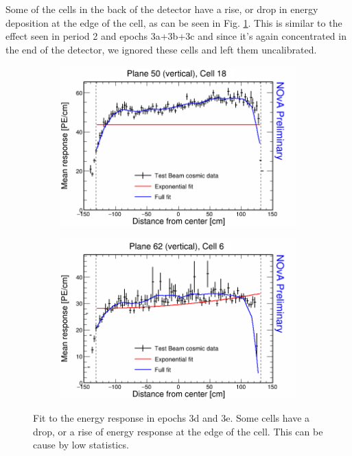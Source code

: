 Some of the cells in the back of the detector have a rise, or drop in energy deposition at the edge of the cell, as can be seen in Fig. \ref{fig:AttenfitResultsEpoch3de_CellEdges}. This is similar to the effect seen in period 2 and epochs 3a+3b+3c and since it's again concentrated in the end of the detector, we ignored these cells and left them uncalibrated.

\begin{figure}[h]
  \begin{subfigure}{0.495\textwidth}
    \includegraphics[width=\linewidth]{Plots/RelativeCalibrationResults/ep3de_050_018.png}
  \end{subfigure}
  \begin{subfigure}{0.495\textwidth}
    \includegraphics[width=\linewidth]{Plots/RelativeCalibrationResults/ep3de_062_006.png}
  \end{subfigure}
  \caption{Fit to the energy response in epochs 3d and 3e. Some cells have a drop, or a rise of energy response at the edge of the cell. This can be cause by low statistics.}
  \label{fig:AttenfitResultsEpoch3de_CellEdges}
\end{figure}

